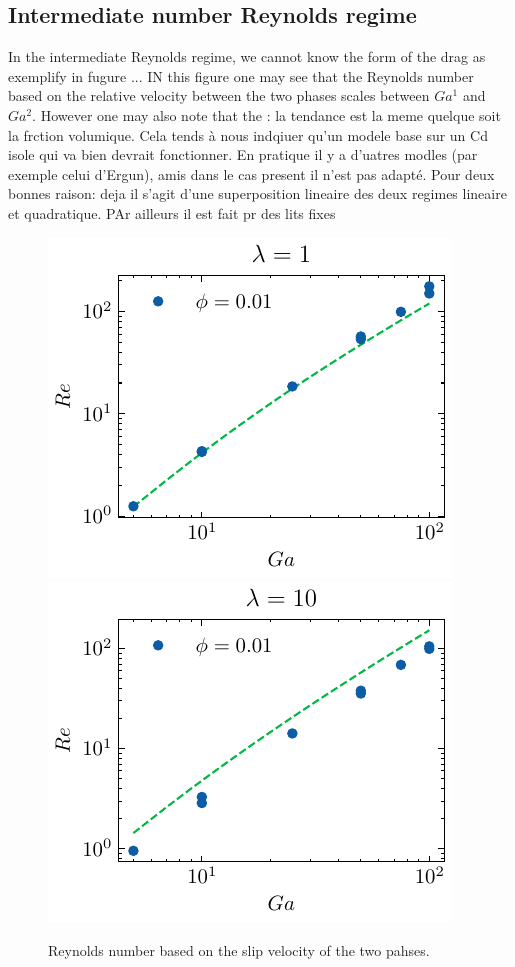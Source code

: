 \subsection{Intermediate number Reynolds regime}

In the intermediate Reynolds regime, we cannot know the form of the drag as exemplify in fugure ... IN this figure one may see that the Reynolds number based on the relative velocity between the two phases scales between $Ga^1$ and $Ga^2$. However one may also note that the : la tendance est la meme quelque soit la frction volumique. Cela tends à nous indqiuer qu'un modele base sur un Cd isole qui va bien devrait fonctionner. En pratique il y a d'uatres modles (par exemple celui d'Ergun), amis dans le cas present il n'est pas adapté. Pour deux bonnes raison: deja il s'agit d'une superposition lineaire des deux 
 regimes lineaire et quadratique. PAr ailleurs il est fait pr des lits fixes
\begin{figure}
\centering
    \includegraphics[height = 0.35\textwidth]{image/HOMOGENEOUS/fCA/Re_N_5_l_1.pdf}
    \includegraphics[height = 0.35\textwidth]{image/HOMOGENEOUS/fCA/Re_N_5_l_10.pdf}
    \caption{Reynolds number based on the slip velocity of the two pahses.}
\end{figure}
 



